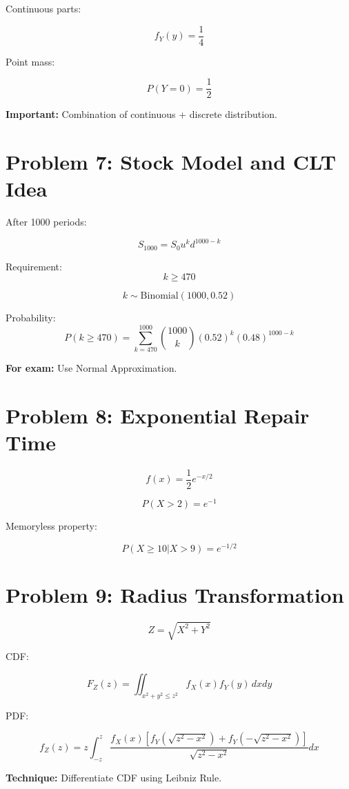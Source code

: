 \documentclass[11pt]{article}
\begin{document}
Continuous parts:

\[
f_Y(y)=\frac14
\]

Point mass:

\[
P(Y=0)=\frac12
\]

\textbf{Important:} Combination of continuous + discrete distribution.

\section{Problem 7: Stock Model and CLT Idea}

After 1000 periods:

\[
S_{1000}=S_0 u^k d^{1000-k}
\]

Requirement:
\[
k \ge 470
\]

\[
k \sim \text{Binomial}(1000,0.52)
\]

Probability:
\[
P(k \ge 470)
=
\sum_{k=470}^{1000}
\binom{1000}{k}
(0.52)^k(0.48)^{1000-k}
\]

\textbf{For exam:} Use Normal Approximation.

\section{Problem 8: Exponential Repair Time}

\[
f(x)=\frac12 e^{-x/2}
\]

\[
P(X>2)=e^{-1}
\]

Memoryless property:

\[
P(X\ge 10|X>9)=e^{-1/2}
\]

\section{Problem 9: Radius Transformation}

\[
Z=\sqrt{X^2+Y^2}
\]

CDF:

\[
F_Z(z)
=
\iint_{x^2+y^2 \le z^2}
f_X(x)f_Y(y)\,dxdy
\]

PDF:

\[
f_Z(z)
=
z
\int_{-z}^{z}
\frac{
f_X(x)\left[
f_Y(\sqrt{z^2-x^2})+
f_Y(-\sqrt{z^2-x^2})
\right]
}{
\sqrt{z^2-x^2}
}
dx
\]

\textbf{Technique:} Differentiate CDF using Leibniz Rule.

\end{document}
